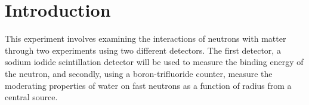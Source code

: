 
\section{Introduction} %
\label{sec:introduction}
This experiment involves examining the interactions of neutrons with matter through two experiments using two different detectors. The first detector, a sodium iodide scintillation detector will be used to measure the binding energy of the neutron, and secondly, using a boron-trifluoride counter, measure the moderating properties of water on fast neutrons as a function of radius from a central source.

